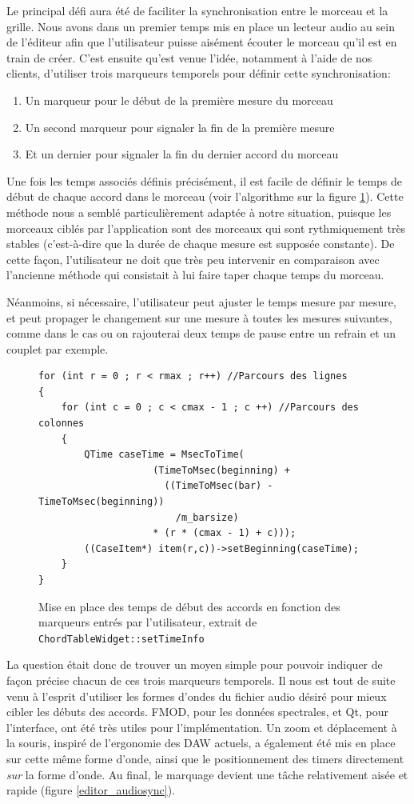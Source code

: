Le principal défi aura été de faciliter la synchronisation entre le morceau et la grille. Nous avons dans un premier temps mis en place un lecteur audio au sein de l'éditeur afin que l'utilisateur puisse aisément écouter le morceau qu'il est en train de créer. C'est ensuite qu'est venue l'idée, notamment à l'aide de nos clients, d'utiliser trois marqueurs temporels pour définir cette synchronisation:
\begin{enumerate}
 \item Un marqueur pour le début de la première mesure du morceau
 \item Un second marqueur pour signaler la fin de la première mesure
 \item Et un dernier pour signaler la fin du dernier accord du morceau
\end{enumerate}
Une fois les temps associés définis précisément, il est facile de définir le temps de début de chaque accord dans le morceau (voir l'algorithme sur la figure \ref{editor_time_caseitems}). Cette méthode nous a semblé particulièrement adaptée à notre situation, puisque les morceaux ciblés par l'application sont des morceaux qui sont rythmiquement très stables (c'est-à-dire que la durée de chaque mesure est supposée constante). De cette façon, l'utilisateur ne doit que très peu intervenir en comparaison avec l'ancienne méthode qui consistait à lui faire taper chaque temps du morceau.

Néanmoins, si nécessaire, l'utilisateur peut ajuster le temps mesure par mesure, et peut propager le changement sur une mesure à toutes
les mesures suivantes, comme dans le cas ou on rajouterai deux temps de pause entre un refrain et un couplet par exemple.

\begin{figure}[H]
\begin{lstlisting}
for (int r = 0 ; r < rmax ; r++) //Parcours des lignes
{
	for (int c = 0 ; c < cmax - 1 ; c ++) //Parcours des colonnes
	{
		QTime caseTime = MsecToTime(
				    (TimeToMsec(beginning) +
				      ((TimeToMsec(bar) - TimeToMsec(beginning))
				        /m_barsize)
				    * (r * (cmax - 1) + c)));
		((CaseItem*) item(r,c))->setBeginning(caseTime);
	}
}
\end{lstlisting}
\caption{Mise en place des temps de début des accords en fonction des marqueurs entrés par l'utilisateur, extrait de \texttt{ChordTableWidget::setTimeInfo}}
\label{editor_time_caseitems}
\end{figure}

La question était donc de trouver un moyen simple pour pouvoir indiquer de façon précise chacun de ces trois marqueurs temporels. Il nous est tout de suite venu à l'esprit d'utiliser les formes d'ondes du fichier audio désiré pour mieux cibler les débuts des accords. FMOD, pour les données spectrales, et Qt, pour l'interface, ont été très utiles pour l'implémentation. Un zoom et déplacement à la souris, inspiré de l'ergonomie des \ac{DAW} actuels, a également été mis en place sur cette même forme d'onde, ainsi que le positionnement des timers directement \textit{sur} la forme d'onde. Au final, le marquage devient une tâche relativement aisée et rapide (figure \ref{editor_audiosync}).

